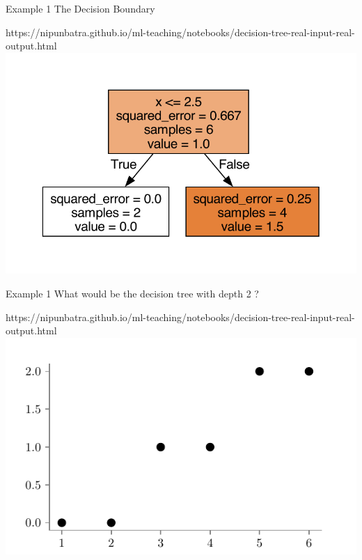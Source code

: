 \documentclass[usenames,dvipsnames]{beamer}
\begin{document}
    \begin{frame}{Example 1}
    The Decision Boundary
    \begin{center}
    	\begin{notebookbox}{https://nipunbatra.github.io/ml-teaching/notebooks/decision-tree-real-input-real-output.html}
    		\includegraphics[scale=0.6]{../assets/decision-trees/figures/ri-ro-depth-1-sklearn.pdf}
    	\end{notebookbox}
    \end{center}
    \end{frame}


    \begin{frame}{Example 1}
    What would be the decision tree with depth 2	?
    \begin{center}
    	\begin{notebookbox}{https://nipunbatra.github.io/ml-teaching/notebooks/decision-tree-real-input-real-output.html}
    		\includegraphics{../assets/decision-trees/figures/ri-ro-dataset.pdf}
    	  \end{notebookbox}
    \end{center}
    \end{frame}
\end{document}

